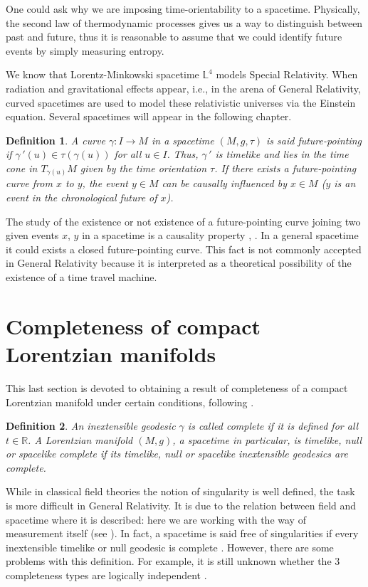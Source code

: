 \documentclass[11pt]{book}
\newtheorem{defi}{Definition}[chapter]
\def\R{\mathbb R}
\def\L{\mathbb L}
\begin{document}
One could ask why we are imposing time-orientability to a spacetime. Physically, the second law of thermodynamic processes gives us a way to distinguish between past and future, thus it is reasonable to assume that we could identify future events by simply measuring entropy. 

We know that Lorentz-Minkowski spacetime $\L^4$ models Special Relativity. When radiation and gravitational effects appear, i.e., in the arena of General Relativity, curved spacetimes are used to model these relativistic universes via the Einstein equation. Several spacetimes will appear in the following chapter.

\begin{defi}
	A curve $\gamma : I \to M$ in a spacetime $(M,g,\tau)$ is said future-pointing if 
	$\gamma{\,'}(u)\in \tau(\gamma(u))$ for all $u\in I$. Thus, $\gamma{\,'}$ is timelike and lies in the time cone in $T_{\gamma(u)}M$ given by the time orientation $\tau$. If there exists a future-pointing curve from $x$ to $y$, the event $y\in M$ can be causally influenced by $x\in M$ ($y$ is an event in the chronological future of $x$). 
\end{defi}

The study of the existence or not existence of a future-pointing curve joining two given events $x$, $y$ in a spacetime is a causality property \cite[Chapter 8]{K}, \cite[Chapter 14]{SRG}. In a general spacetime it could exists a closed future-pointing curve. This fact is not commonly accepted in General Relativity because it is interpreted as a theoretical possibility of the existence of a time travel machine.

\section{Completeness of compact Lorentzian manifolds}\label{section 1.6}
This last section is devoted to obtaining a result of completeness of a compact Lorentzian manifold under certain conditions, following \cite{RS}.
\begin{defi}
	An inextensible geodesic $\gamma$ is called complete if it is defined for all $t\in \R$.
	A Lorentzian manifold $(M,g)$, a spacetime in particular, is timelike, null or spacelike complete if its timelike, null or spacelike inextensible geodesics are complete. 
\end{defi}
While in classical field theories the notion of singularity is well defined, the task is more difficult in General Relativity. It is due to the relation between field and spacetime where it is described: here we are working with the way of measurement itself (see \cite{SgG}). In fact, a spacetime is said free of singularities if every inextensible timelike or null geodesic is complete \cite[Definition 1]{SgG}. However, there are some problems with this definition. For example, it is still unknown whether the 3 completeness types are logically independent \cite[Section 2]{MLG}.
\end{document}
